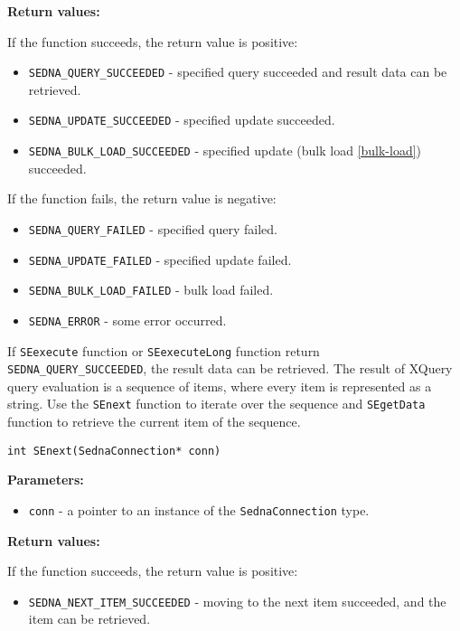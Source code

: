 \documentclass[a4paper,12pt]{article}
\newenvironment{citemize}
{\begin{itemize}
  \setlength{\itemsep}{0pt}
  \setlength{\parskip}{0pt}
  \setlength{\parsep}{0pt}}
{\end{itemize}}
\begin{document}
\noindent
\textbf{Return values:}

\medskip

\noindent
If the function succeeds, the return value is positive:

\begin{citemize}
\item\verb!SEDNA_QUERY_SUCCEEDED! - specified query succeeded and result data
can be retrieved.
\item\verb!SEDNA_UPDATE_SUCCEEDED! - specified update succeeded.
\item\verb!SEDNA_BULK_LOAD_SUCCEEDED! - specified update (bulk load
\ref{bulk-load}) succeeded.
\end{citemize}

\noindent
If the function fails, the return value is negative:

\begin{citemize}
\item\verb!SEDNA_QUERY_FAILED! - specified query failed.
\item\verb!SEDNA_UPDATE_FAILED! - specified update failed.
\item\verb!SEDNA_BULK_LOAD_FAILED! - bulk load failed.
\item\verb!SEDNA_ERROR! - some error occurred.
\end{citemize}

If \verb!SEexecute! function or \verb!SEexecuteLong! function return
\verb!SEDNA_QUERY_SUCCEEDED!, the result data can be retrieved. The result of
XQuery query evaluation is a sequence of items, where every item is represented
as a string. Use the \verb!SEnext! function to iterate over the sequence and
\verb!SEgetData! function to retrieve the current item of the sequence.

\begin{verbatim}
int SEnext(SednaConnection* conn)
\end{verbatim}

\noindent
\textbf{Parameters:}

\begin{citemize}
\item\verb!conn! - a pointer to an instance of the \verb!SednaConnection! type.
\end{citemize}

\noindent
\textbf{Return values:}

\medskip

\noindent
If the function succeeds, the return value is positive:

\begin{citemize}
\item\verb!SEDNA_NEXT_ITEM_SUCCEEDED! - moving to the next item succeeded, and
the item can be retrieved.
\end{citemize}
\end{document}
